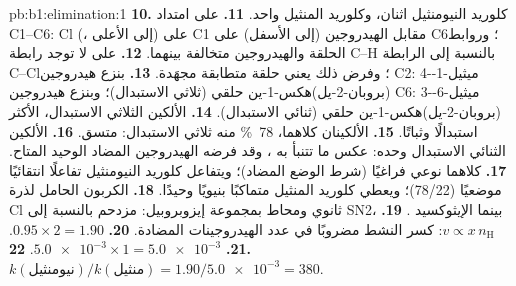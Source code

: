 \begin{solution}{pb:b1:elimination:1}
\textbf{10.} كلوريد النيومنثيل اثنان، وكلوريد المنثيل واحد.
\textbf{11.} على امتداد C1--C6: Cl (، إلى الأعلى) على C1 مقابل الهيدروجين  (إلى الأسفل)
على C6؛ وروابط الحلقة والهيدروجين  متخالفة بينهما.
\textbf{12.} على  لا توجد رابطة C--H  بالنسبة إلى الرابطة C--Cl؛
وفرض ذلك يعني حلقة متطابقة مجهَدة.
\textbf{13.} بنزع هيدروجين C2: 4-ميثيل-1-(بروبان-2-يل)هكس-1-ين حلقي
(ثلاثي الاستبدال)؛ وبنزع هيدروجين C6: 3-ميثيل-6-(بروبان-2-يل)هكس-1-ين حلقي
(ثنائي الاستبدال).
\textbf{14.} الألكين الثلاثي الاستبدال، الأكثر استبدالًا وثباتًا.
\textbf{15.} الألكينان كلاهما، \qty{78}{\percent} منه ثلاثي الاستبدال: متسق.
\textbf{16.} الألكين الثنائي الاستبدال وحده: عكس ما تتنبأ به
، وقد فرضه الهيدروجين المضاد الوحيد المتاح.
\textbf{17.} كلاهما نوعي فراغيًا (شرط الوضع المضاد)؛ ويتفاعل كلوريد النيومنثيل
تفاعلًا انتقائيًا موضعيًا (78/22)؛ ويعطي كلوريد المنثيل متماكبًا
بنيويًا وحيدًا.
\textbf{18.} الكربون الحامل لذرة Cl ثانوي ومحاط بمجموعة
إيزوبروبيل: مزدحم بالنسبة إلى SN2، بينما الإيثوكسيد .
\textbf{19.} $v \propto x\,n_{\mathrm{H}}$: كسر  النشط مضروبًا في
عدد الهيدروجينات المضادة.
\textbf{20.} $0.95 \times 2 = 1.90$.
\textbf{21.} $\num{5.0e-3} \times 1 = \num{5.0e-3}$.
\textbf{22.} \textbf{$k(\text{نيومنثيل})/k(\text{منثيل}) = 1.90/\num{5.0e-3}
= 380$}.
\end{solution}
